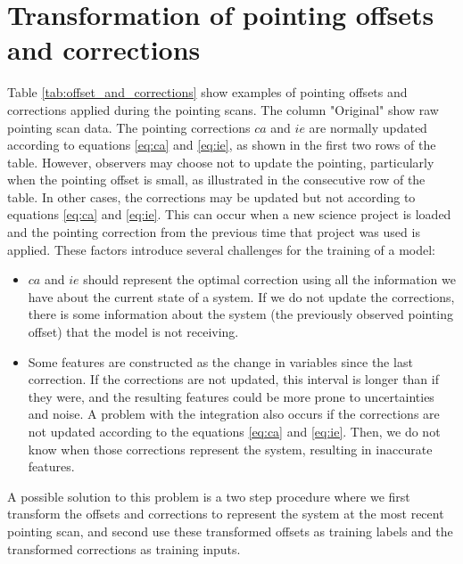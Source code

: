 \section{Transformation of pointing offsets and corrections}

Table \ref{tab:offset_and_corrections} show examples of pointing offsets and corrections applied during the pointing scans.
The column "Original" show raw pointing scan data.
The pointing corrections $ca$ and $ie$ are normally updated according to equations \eqref{eq:ca} and \eqref{eq:ie}, 
as shown in the first two rows of the table.
However, observers may choose not to update the pointing, particularly when the pointing offset is small, as illustrated in the consecutive row of the table.
In other cases, the corrections may be updated but not according to equations \eqref{eq:ca} and \eqref{eq:ie}.
This can occur when a new science project is loaded and the pointing correction from the previous time that project was used is applied.
These factors introduce several challenges for the training of a model:
\begin{itemize}
    \item $ca$ and $ie$ should represent the optimal correction using all the information we have about the current state of a system.
    If we do not update the corrections, there is some information about the system (the previously observed pointing offset) that the model is not receiving.
    \item Some features are constructed as the change in variables since the last correction.
    If the corrections are not updated, this interval is longer than if they were, and the resulting features could be more prone to uncertainties and noise.
    A problem with the integration also occurs if the corrections are not updated according to the equations \eqref{eq:ca} and \eqref{eq:ie}.
    Then, we do not know when those corrections represent the system, resulting in inaccurate features.
\end{itemize}

A possible solution to this problem is a two step procedure where we first transform the offsets and corrections to represent the system at the most recent pointing scan,
and second use these transformed offsets as training labels and the transformed corrections as training inputs.

